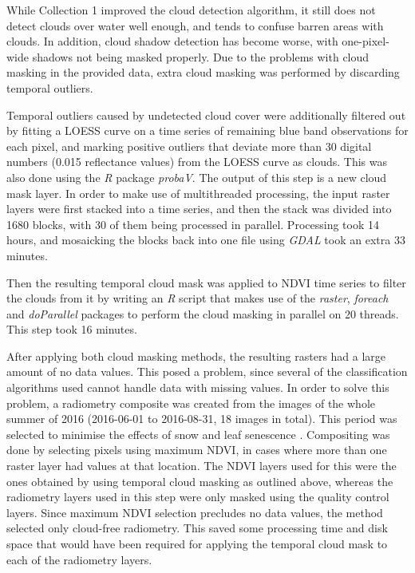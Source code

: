 \documentclass[a4paper,12pt]{scrbook}
\begin{document}
While Collection 1 improved the cloud detection algorithm, it still does not detect clouds over water well enough, and tends to confuse barren areas with clouds. In addition, cloud shadow detection has become worse, with one-pixel-wide shadows not being masked properly. Due to the problems with cloud masking in the provided data, extra cloud masking was performed by discarding temporal outliers.

Temporal outliers caused by undetected cloud cover were additionally filtered out by fitting a LOESS curve on a time series of remaining blue band observations for each pixel, and marking positive outliers that deviate more than 30 digital numbers (0.015 reflectance values) from the LOESS curve as clouds. This was also done using the \textit{R} package \textit{probaV}. The output of this step is a new cloud mask layer. In order to make use of multithreaded processing, the input raster layers were first stacked into a time series, and then the stack was divided into 1680 blocks, with 30 of them being processed in parallel. Processing took 14 hours, and mosaicking the blocks back into one file using \textit{GDAL} took an extra 33 minutes.

Then the resulting temporal cloud mask was applied to NDVI time series to filter the clouds from it by writing an \textit{R} script that makes use of the \textit{raster}, \textit{foreach} and \textit{doParallel} packages to perform the cloud masking in parallel on 20 threads. This step took 16 minutes.

After applying both cloud masking methods, the resulting rasters had a large amount of no data values. This posed a problem, since several of the classification algorithms used cannot handle data with missing values. In order to solve this problem, a radiometry composite was created from the images of the whole summer of 2016 (2016-06-01 to 2016-08-31, 18 images in total). This period was selected to minimise the effects of snow and leaf senescence \citep{bartalev2014probavboreal}. Compositing was done by selecting pixels using maximum NDVI, in cases where more than one raster layer had values at that location. The NDVI layers used for this were the ones obtained by using temporal cloud masking as outlined above, whereas the radiometry layers used in this step were only masked using the quality control layers. Since maximum NDVI selection precludes no data values, the method selected only cloud-free radiometry. This saved some processing time and disk space that would have been required for applying the temporal cloud mask to each of the radiometry layers.
\end{document}
